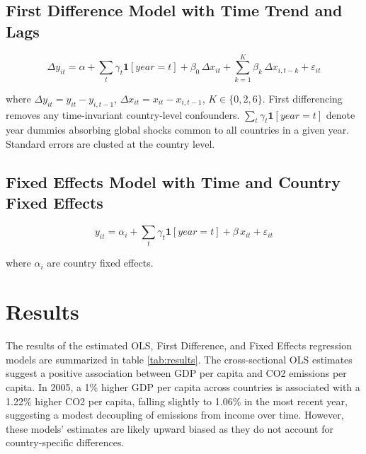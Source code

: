 \documentclass[12pt, a4paper]{article}
\begin{document}
\subsection{First Difference Model with Time Trend and Lags}

\begin{equation}
\Delta y_{it} = \alpha + \sum_t \gamma_t \mathbf{1}[year = t] +  \beta_0 \, \Delta x_{it} + \sum_{k=1}^{K} \beta_k \, \Delta x_{i,t-k} + \varepsilon_{it}
\label{eq:fd}
\end{equation}

where $\Delta y_{it} = y_{it} - y_{i,t-1}$, $\Delta x_{it} = x_{it} - x_{i,t-1}$,  $K \in \{0, 2, 6\}$. First differencing removes any time-invariant country-level confounders. $\sum_t \gamma_t \mathbf{1}[year = t]$ denote year dummies absorbing global shocks common to all countries in a given year. Standard errors are clusted at the country level.

\subsection{Fixed Effects Model with Time and Country Fixed Effects}

\begin{equation}
y_{it} = \alpha_i + \sum_t \gamma_t \mathbf{1}[year = t] + \beta \, x_{it} + \varepsilon_{it}
\label{eq:fe}
\end{equation}

where $\alpha_i$ are country fixed effects.

\section{Results}

The results of the estimated OLS, First Difference, and Fixed Effects regression models are summarized in table \ref{tab:results}. The cross-sectional OLS estimates suggest a positive association between GDP per capita and CO2 emissions per capita. In 2005, a 1\% higher GDP per capita across countries is associated with a 1.22\% higher CO2 per capita, falling slightly to 1.06\% in the most recent year, suggesting a modest decoupling of emissions from income over time. However, these models' estimates are likely upward biased as they do not account for country-specific differences.
\end{document}
